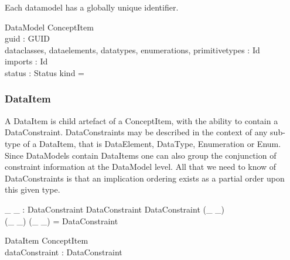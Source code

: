 \documentclass{llncs}
\def\datamodel{\mathsf{datamodel}}
\def\Cimplies{\mathrel{\implies_c}}
\begin{document}
Each datamodel has a globally unique identifier.  
\begin{zed}
  [GUID]
\end{zed}

\begin{schema}{DataModel}
  ConceptItem \\
  guid : GUID \\
  dataclasses, dataelements, datatypes, enumerations, primitivetypes : \power Id \\
  imports : \power Id \\
  status : Status 
  \where
  kind = \datamodel
\end{schema}


\subsubsection{DataItem}
A DataItem is child artefact of a ConceptItem, with the ability to contain a DataConstraint. DataConstraints may be described in the context of any sub-type of a DataItem, that is DataElement, DataType, Enumeration or Enum. Since DataModels contain DataItems one can also group the conjunction of constraint information at the DataModel level.  All that we need to know of DataConstraints is that an implication ordering exists as a partial order upon this given type. 

\begin{zed}
  [DataConstraint]
\end{zed}

\begin{axdef}
  \_ \Cimplies \_ : DataConstraint \rel DataConstraint 
  \where
  \id DataConstraint \subseteq (\_ \Cimplies \_) \\
  (\_ \Cimplies \_) \cap (\_ \Cimplies \_) \inv = \id DataConstraint   
\end{axdef}



\begin{schema}{DataItem}
 ConceptItem \\
 dataConstraint : DataConstraint \\
\end{schema}
\end{document}
